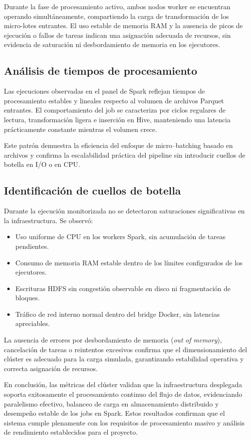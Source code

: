 \documentclass[12pt,a4paper]{article}
\begin{document}
	Durante la fase de procesamiento activo, ambos nodos worker se encuentran operando simultáneamente, compartiendo la carga de transformación de los micro-lotes entrantes. El uso estable de memoria RAM y la ausencia de picos de ejecución o fallos de tareas indican una asignación adecuada de recursos, sin evidencia de saturación ni desbordamiento de memoria en los ejecutores.
	
	
	\subsection{Análisis de tiempos de procesamiento}
	
	Las ejecuciones observadas en el panel de Spark reflejan tiempos de procesamiento estables y lineales respecto al volumen de archivos Parquet entrantes. El comportamiento del job se caracteriza por ciclos regulares de lectura, transformación ligera e inserción en Hive, manteniendo una latencia prácticamente constante mientras el volumen crece.
	
	Este patrón demuestra la eficiencia del enfoque de micro--batching basado en archivos y confirma la escalabilidad práctica del pipeline sin introducir cuellos de botella en I/O o en CPU.
	
	
	\subsection{Identificación de cuellos de botella}
	
	Durante la ejecución monitorizada no se detectaron saturaciones significativas en la infraestructura. Se observó:
	
	\begin{itemize}
		\item Uso uniforme de CPU en los workers Spark, sin acumulación de tareas pendientes.
		\item Consumo de memoria RAM estable dentro de los límites configurados de los ejecutores.
		\item Escrituras HDFS sin congestión observable en disco ni fragmentación de bloques.
		\item Tráfico de red interno normal dentro del bridge Docker, sin latencias apreciables.
	\end{itemize}
	
	La ausencia de errores por desbordamiento de memoria (\textit{out of memory}), cancelación de tareas o reintentos excesivos confirma que el dimensionamiento del clúster es adecuado para la carga simulada, garantizando estabilidad operativa y correcta asignación de recursos.
	
	En conclusión, las métricas del clúster validan que la infraestructura desplegada soporta exitosamente el procesamiento continuo del flujo de datos, evidenciando paralelismo efectivo, balanceo de carga en almacenamiento distribuido y desempeño estable de los jobs en Spark. Estos resultados confirman que el sistema cumple plenamente con los requisitos de procesamiento masivo y análisis de rendimiento establecidos para el proyecto.
	
\end{document}
